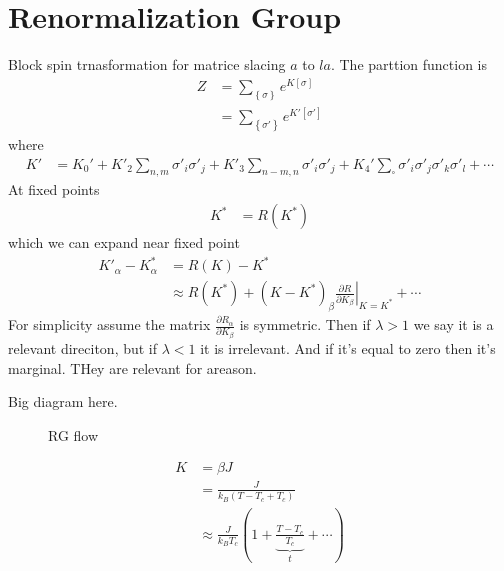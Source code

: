 \section{Renormalization Group}
Block spin trnasformation for matrice slacing $a$ to $la$.
The parttion function is
\begin{align}
    Z &=
    \sum_{ \left\{ \sigma \right\}} e^{K\left[ \sigma \right]}\\
    &=
    \sum_{ \left\{ \sigma' \right\}} e^{K' \left[ \sigma' \right]}
\end{align}
where
\begin{align}
    K'
    &=
    K_0'
    +
    K'_2
    \sum_{n,m} \sigma'_{i} \sigma'_{j}
    +
    K'_3
    \sum_{n-m,n} \sigma'_i \sigma'_j
    +
    K_4' \sum_{\square}
    \sigma'_i \sigma'_j \sigma'_k \sigma'_l
    + \cdots
\end{align}
At fixed points
\begin{align}
    K^* &= R\left( K^* \right)
\end{align}
which we can expand near fixed point
\begin{align}
    K'_{\alpha}
    -
    K_{\alpha}^*
    &=
    R\left( K \right)
    -
    K^*\\
    &\approx
    R\left( K^* \right)
    +
    \left( K - K^* \right)_{\beta}
    \left.
    \frac{\partial R}{\partial K_{\beta}}
    \right|_{K=K^*}
    +
    \cdots
\end{align}
For simplicity assume the matrix $\frac{\partial R_\alpha}{\partial K_\beta}$
is symmetric.
Then if $\lambda > 1$ we say it is a relevant direciton,
but if $\lambda < 1$ it is irrelevant.
And if it's equal to zero then it's marginal.
THey are relevant for areason.

Big diagram here.
\begin{figure}[h]
    \begin{center}
        
    \end{center}
    \caption{RG flow}%
    \label{fig:rgflow}
\end{figure}
\begin{align}
    K &=
    \beta J\\
    &=
    \frac{J}{k_B \left( T - T_c + T_c \right)}\\
    &\approx
    \frac{J}{k_B T_c}
    \left( 
    1
    +
    \underbrace{\frac{T - T_c}{T_c}}_{t}
    + \cdots
    \right)
\end{align}

